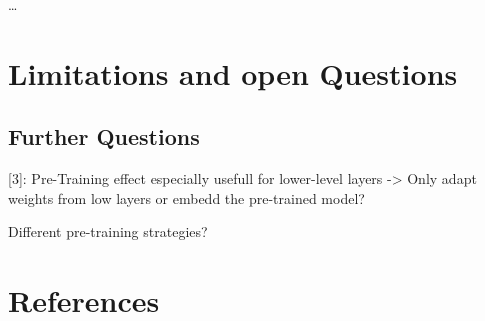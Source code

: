 \documentclass[
  11pt,
]{article}
\begin{document}
\ldots{}

\hypertarget{limitations-and-open-questions}{%
\section{Limitations and open
Questions}\label{limitations-and-open-questions}}

\hypertarget{further-questions}{%
\subsection{Further Questions}\label{further-questions}}

{[}3{]}: Pre-Training effect especially usefull for lower-level layers
-\textgreater{} Only adapt weights from low layers or embedd the
pre-trained model?

Different pre-training strategies?

\newpage

\hypertarget{I}{%
\section*{References}\label{I}}
\end{document}
